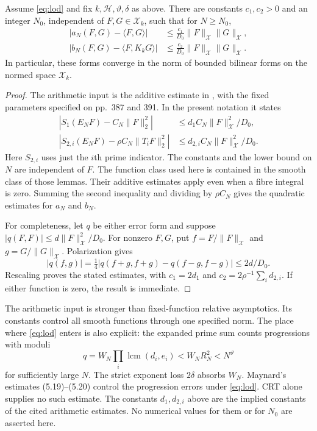 \documentclass[11pt]{article}
\begin{document}
\begin{theorem}\label{thm:forms}
Assume \eqref{eq:lod} and fix $k,\mathcal H,\vartheta,\delta$ as above.
There are constants $c_1,c_2>0$ and an integer $N_0$, independent of
$F,G\in\mathcal X_k$, such that for $N\geq N_0$,
\begin{align}
 |a_N(F,G)-\langle F,G\rangle|
 &\leq\frac{c_1}{D_0}\|F\|_{\mathcal X}\|G\|_{\mathcal X},
                                                       \label{eq:mass-error}\\
 |b_N(F,G)-\langle F,K_kG\rangle|
 &\leq\frac{c_2}{D_0}\|F\|_{\mathcal X}\|G\|_{\mathcal X}.
                                                       \label{eq:prime-error}
\end{align}
In particular, these forms converge in the norm of bounded bilinear forms
on the normed space $\mathcal X_k$.
\end{theorem}

\begin{proof}
The arithmetic input is the additive estimate in
\cite[Lemmas 6.2--6.3, pp.~401--404]{Maynard}, with the fixed parameters
specified on pp.~387 and 391.  In the present notation it states
\begin{align*}
 |S_1(E_NF)-C_N\|F\|_2^2|
   &\leq d_1C_N\|F\|_{\mathcal X}^2/D_0,\\
 |S_{2,i}(E_NF)-\rho C_N\|T_iF\|_2^2|
   &\leq d_{2,i}C_N\|F\|_{\mathcal X}^2/D_0.
\end{align*}
Here $S_{2,i}$ uses just the $i$th prime indicator.  The constants and
the lower bound on $N$ are independent of $F$.
The function class used here is contained in the smooth class of those
lemmas.  Their additive estimates apply even when a fibre integral is zero.
Summing the second inequality and dividing by $\rho C_N$ gives the
quadratic estimates for $a_N$ and $b_N$.

For completeness, let $q$ be either error form and suppose
$|q(F,F)|\leq d\|F\|_{\mathcal X}^2/D_0$.
For nonzero $F,G$, put $f=F/\|F\|_{\mathcal X}$ and
$g=G/\|G\|_{\mathcal X}$.  Polarization gives
\[
 |q(f,g)|=\tfrac14|q(f+g,f+g)-q(f-g,f-g)|\leq2d/D_0.
\]
Rescaling proves the stated estimates, with
$c_1=2d_1$ and $c_2=2\rho^{-1}\sum_i d_{2,i}$.
If either function is zero, the result is immediate.
\end{proof}

The arithmetic input is stronger than fixed-function relative asymptotics.
Its constants control all smooth functions through one specified norm.
The place where \eqref{eq:lod} enters is also explicit: the expanded prime
sum counts progressions with moduli
\[
                 q=W_N\prod_i\operatorname{lcm}(d_i,e_i)
                      <W_NR_N^2<N^\vartheta
\]
for sufficiently large $N$.
The strict exponent loss $2\delta$ absorbs $W_N$.
Maynard's estimates (5.19)--(5.20) control the progression errors under
\eqref{eq:lod}.  CRT alone supplies no such estimate.
The constants $d_1,d_{2,i}$ above are the implied constants of the cited
arithmetic estimates.  No numerical values for them or for $N_0$ are
asserted here.
\end{document}
